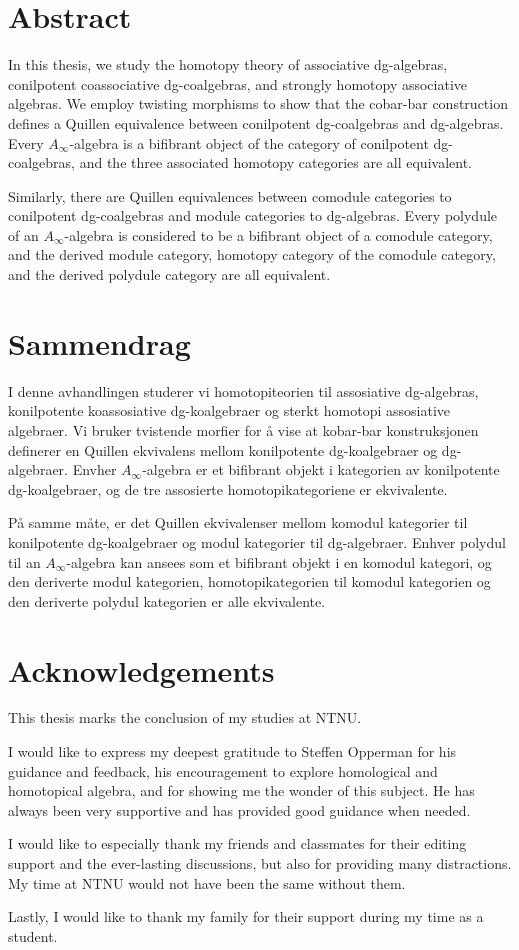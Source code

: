 \documentclass[../thesis.tex]{subfiles}
\begin{document}
    \section*{Abstract}
        In this thesis, we study the homotopy theory of associative dg-algebras, conilpotent coassociative dg-coalgebras, and strongly homotopy associative algebras. We employ twisting morphisms to show that the cobar-bar construction defines a Quillen equivalence between conilpotent dg-coalgebras and dg-algebras. Every $A_\infty$-algebra is a bifibrant object of the category of conilpotent dg-coalgebras, and the three associated homotopy categories are all equivalent.

        Similarly, there are Quillen equivalences between comodule categories to conilpotent dg-coalgebras and module categories to dg-algebras. Every polydule of an $A_\infty$-algebra is considered to be a bifibrant object of a comodule category, and the derived module category, homotopy category of the comodule category, and the derived polydule category are all equivalent.

    \section*{Sammendrag}
        I denne avhandlingen studerer vi homotopiteorien til assosiative dg-algebras, konilpotente koassosiative dg-koalgebraer og sterkt homotopi assosiative algebraer. Vi bruker tvistende morfier for å vise at kobar-bar konstruksjonen definerer en Quillen ekvivalens mellom konilpotente dg-koalgebraer og dg-algebraer. Envher $A_\infty$-algebra er et bifibrant objekt i kategorien av konilpotente dg-koalgebraer, og de tre assosierte homotopikategoriene er ekvivalente.

        På samme måte, er det Quillen ekvivalenser mellom komodul kategorier til konilpotente dg-koalgebraer og modul kategorier til dg-algebraer. Enhver polydul til an $A_\infty$-algebra kan ansees som et bifibrant objekt i en komodul kategori, og den deriverte modul kategorien, homotopikategorien til komodul kategorien og den deriverte polydul kategorien er alle ekvivalente.

    \section*{Acknowledgements}
        This thesis marks the conclusion of my studies at NTNU.

        I would like to express my deepest gratitude to Steffen Opperman for his guidance and feedback, his encouragement to explore homological and homotopical algebra, and for showing me the wonder of this subject. He has always been very supportive and has provided good guidance when needed.

        I would like to especially thank my friends and classmates for their editing support and the ever-lasting discussions, but also for providing many distractions. My time at NTNU would not have been the same without them.
        
        Lastly, I would like to thank my family for their support during my time as a student.
\end{document}
